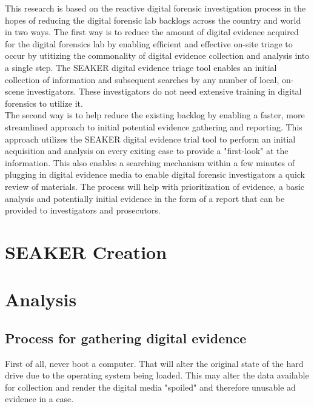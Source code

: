 \documentclass[12pt]{article}
\begin{document}
This research is based on the reactive digital forensic investigation process in the hopes of reducing the digital
forensic lab backlogs across the country and world in two ways.  The first way is to reduce the amount of digital
evidence acquired for the digital forensics lab by enabling efficient and effective on-site triage to occur by
utitizing the commonality of digital evidence collection and analysis into a single step.  The SEAKER digital
evidence triage tool enables an initial collection of information and subsequent searches by any number of local,
on-scene investigators.  These investigators do not need extensive training in digital forensics to utilize it.\\

The second way is to help reduce the existing backlog by enabling a faster, more streamlined approach to initial
potential evidence gathering and reporting.  This approach utilizes the SEAKER digital evidence trial tool to 
perform an initial acquisition and analysis on every exiting case to provide a "first-look" at the information.  This
also enables a searching mechanism within a few minutes of plugging in digital evidence media to enable digital 
forensic investigators a quick review of materials.  The process will help with prioritization of evidence, a basic
analysis and potentially initial evidence in the form of a report that can be provided to investigators and
prosecutors.\\

\section{SEAKER Creation}
\label{sect-Creation}

\section{Analysis}
\label{sect-analysis}

\subsection{Process for gathering digital evidence}

First of all, never boot a computer.  That will alter the original state of the hard drive due to the operating
system being loaded.  This may alter the data available for collection and render the digital media "spoiled" and
therefore unusable ad evidence in a case.\\
\end{document}
